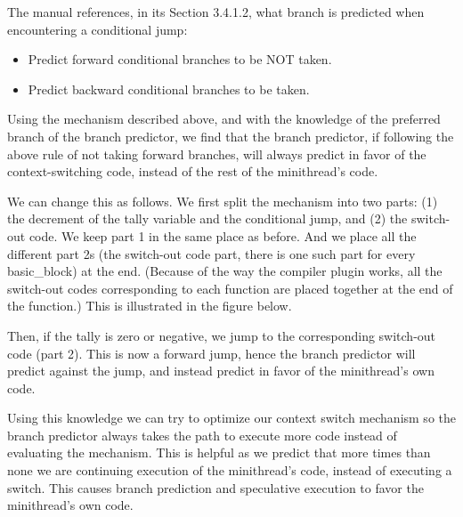 \documentclass[12pt,a4paper]{report}
\begin{document}
The \cite{Intel} manual references, in its Section 3.4.1.2, what branch is predicted when encountering a conditional jump:
\begin{itemize}
    \item Predict forward conditional branches to be NOT taken.
    \item Predict backward conditional branches to be taken.
\end{itemize}


Using the mechanism described above, and with the knowledge of the preferred branch of the branch predictor, we find that the branch predictor, if following the above rule of not taking forward branches, will always predict in favor of the context-switching code, instead of the rest of the minithread's code.

We can change this as follows. We first split the mechanism into two parts: (1) the decrement of the tally variable and the conditional jump, and (2) the switch-out code. We keep part 1 in the same place as before. And we place all the different part 2s (the switch-out code part, there is one such part for every basic\_block) at the end. (Because of the way the compiler plugin works, all the switch-out codes corresponding to each function are placed together at the end of the function.) This is illustrated in the figure below.

Then, if the tally is zero or negative, we jump to the corresponding switch-out code (part 2). This is now a forward jump, hence the branch predictor will predict against the jump, and instead predict in favor of the minithread's own code.

Using this knowledge we can try to optimize our context switch mechanism so the branch predictor always takes the path to execute more code instead of evaluating the mechanism. This is helpful as we predict that more times than none we are continuing execution of the minithread's code, instead of executing a switch. This causes branch prediction and speculative execution to favor the minithread's own code.
\end{document}

